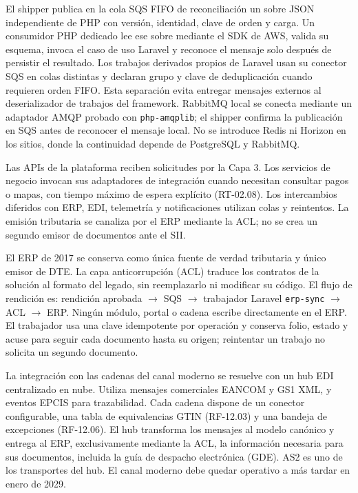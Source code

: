 El shipper publica en la cola SQS FIFO de reconciliación un sobre JSON independiente de PHP con versión, identidad, clave de orden y carga. Un consumidor PHP dedicado lee ese sobre mediante el SDK de AWS, valida su esquema, invoca el caso de uso Laravel y reconoce el mensaje solo después de persistir el resultado. Los trabajos derivados propios de Laravel usan su conector SQS en colas distintas y declaran grupo y clave de deduplicación cuando requieren orden FIFO. Esta separación evita entregar mensajes externos al deserializador de trabajos del framework. RabbitMQ local se conecta mediante un adaptador AMQP probado con \texttt{php-amqplib}; el shipper confirma la publicación en SQS antes de reconocer el mensaje local. No se introduce Redis ni Horizon en los sitios, donde la continuidad depende de PostgreSQL y RabbitMQ.

Las APIs de la plataforma reciben solicitudes por la Capa 3. Los servicios de negocio invocan sus adaptadores de integración cuando necesitan consultar pagos o mapas, con tiempo máximo de espera explícito (RT-02.08). Los intercambios diferidos con ERP, EDI, telemetría y notificaciones utilizan colas y reintentos. La emisión tributaria se canaliza por el ERP mediante la ACL; no se crea un segundo emisor de documentos ante el SII.

El ERP de 2017 se conserva como única fuente de verdad tributaria y único emisor de DTE. La capa anticorrupción (ACL) traduce los contratos de la solución al formato del legado, sin reemplazarlo ni modificar su código. El flujo de rendición es: rendición aprobada $\rightarrow$ SQS $\rightarrow$ trabajador Laravel \texttt{erp-sync} $\rightarrow$ ACL $\rightarrow$ ERP. Ningún módulo, portal o cadena escribe directamente en el ERP. El trabajador usa una clave idempotente por operación y conserva folio, estado y acuse para seguir cada documento hasta su origen; reintentar un trabajo no solicita un segundo documento.

La integración con las cadenas del canal moderno se resuelve con un hub EDI centralizado en nube. Utiliza mensajes comerciales EANCOM y GS1 XML, y eventos EPCIS para trazabilidad. Cada cadena dispone de un conector configurable, una tabla de equivalencias GTIN (RF-12.03) y una bandeja de excepciones (RF-12.06). El hub transforma los mensajes al modelo canónico y entrega al ERP, exclusivamente mediante la ACL, la información necesaria para sus documentos, incluida la guía de despacho electrónica (GDE). AS2 es uno de los transportes del hub. El canal moderno debe quedar operativo a más tardar en enero de 2029.

